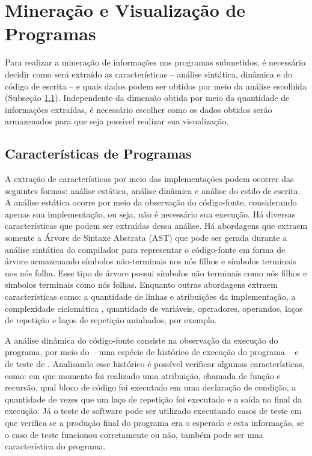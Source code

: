 	\section{Mineração e Visualização de Programas}
	\label{sec:MinVisual}
		Para realizar a mineração de informações nos programas submetidos, é necessário
		decidir como será extraído as características -- análise sintática, dinâmica e
		do código de escrita -- e quais dados podem ser obtidos por meio da análise
		escolhida (Subseção \ref{subSec:Caracteristicas}). Independente da dimensão
		obtida por meio da quantidade de informações extraídas, é necessário escolher
		como os dados obtidos serão armazenados para que seja possível realizar sua visualização.
		
		\subsection{Características de Programas}
		\label{subSec:Caracteristicas}

			A extração de características por meio das implementações podem ocorrer das
			seguintes formas: análise estática, análise dinâmica e análise do estilo de escrita.
			A análise estática ocorre por meio da observação do código-fonte, considerando
			apenas sua implementação, ou seja, não é necessário sua execução. Há diversas
			características que podem ser extraídas dessa análise. Há abordagens que extraem
			somente a Árvore de Sintaxe Abstrata (AST) que pode ser gerada durante a análise
			sintática do compilador para representar o código-fonte em forma de árvore
			armazenando símbolos não-terminais nos nós filhos e símbolos terminais nos
			nós folha. Esse tipo de árvore possui símbolos não terminais como nós filhos
			e símbolos terminais como nós folhas. Enquanto outras abordagens extraem
			características como: a quantidade de linhas e atribuições da implementação,
			a complexidade ciclomática \cite{mccabe}, quantidade de variáveis, operadores,
			operandos, laços de repetição e laços de repetição aninhados, por exemplo.
			
			A análise dinâmica do código-fonte consiste na observação da execução do
			programa, por meio do  -- uma espécie de histórico de execução
			do programa -- e de teste de . Analisando esse histórico é
			possível verificar algumas características, como: em que momento foi realizado
			uma atribuição, chamada de função e recursão, qual bloco de código foi
			executado em uma declaração de condição, a quantidade de vezes que um laço
			de repetição foi executado e a saída no final da execução. Já o teste de
			software pode ser utilizado executando casos de teste em que verifica se a
			produção final do programa era o esperado e esta informação, se o caso de
			teste funcionou corretamente ou não, também pode ser uma característica do programa.
			
